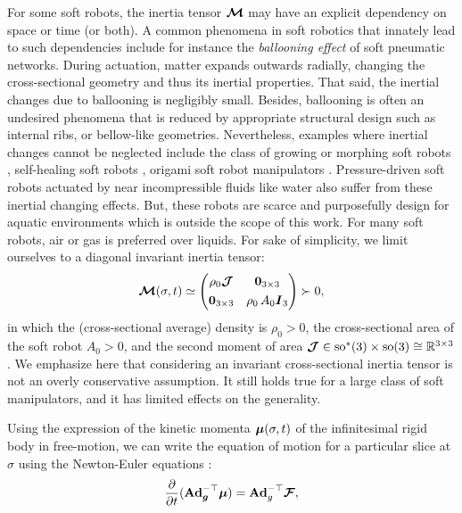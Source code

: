 \begin{rmk}
  For some soft robots, the inertia tensor ${\boldsymbol{\mathcal{M}}}$ may have an explicit dependency on space or time (or both). A common phenomena in soft robotics that innately lead to such dependencies include for instance the \textit{ballooning effect} of soft pneumatic networks. During actuation, matter expands outwards radially, changing the cross-sectional geometry and thus its inertial properties. That said, the inertial changes due to ballooning is negligibly small. Besides, ballooning is often an undesired phenomena that is reduced by appropriate structural design such as internal ribs, or bellow-like geometries. Nevertheless, examples where inertial changes cannot be neglected include the class of growing or morphing soft robots \cite{Hawkes2017,Joachimczak2014Jul,Joachimczak2015}, self-healing soft robots \cite{Terryn2021Jul,Roels2020Dec}, origami soft robot manipulators \cite{Li2022Nov,Jiang2016Dec,Wu2021Sep}. Pressure-driven soft robots actuated by near incompressible fluids like water also suffer from these inertial changing effects. But, these robots are scarce and purposefully design for aquatic environments which is outside the scope of this work. For many soft robots, air or gas is preferred over liquids. 
For sake of simplicity, we limit ourselves to a diagonal invariant inertia tensor: 
%
\begin{equation*}
{\boldsymbol{\mathcal{M}}}(\sigma,t) \simeq \begin{pmatrix} \rho_0 \boldsymbol{\mathcal{J}}  & \boldsymbol{0}_{3\times3}  \\[0.35em]
  \boldsymbol{0}_{3\times3} & \rho_0\, A_0\boldsymbol{I}_3 \end{pmatrix} \succ 0,
\end{equation*}
%
in which the (cross-sectional average) density is $\rho_0 > 0$, the cross-sectional area of the soft robot $A_0>0$, and the second moment of area $\boldsymbol{\mathcal{J}} \in \textup{\textrm{so}}^*(3) \times \textup{\textrm{so}}(3) \cong \mathbb{R}^{3\times 3}$.
We emphasize here that considering an invariant cross-sectional inertia tensor is not an overly conservative assumption. It still holds true for a large class of soft manipulators, and it has limited effects on the generality. \end{rmk}
%
\noindent Using the expression of the kinetic momenta $\boldsymbol{\mu}(\sigma,t)$ of the infinitesimal rigid body in free-motion, we can write the equation of motion for a particular slice at $\sigma$ using the Newton-Euler equations \cite{Garofalo2013}:
%
\begin{equation}
\frac{\partial }{\partial t} (\textbf{Ad}_{{\boldsymbol{g}}}^{-\top} \boldsymbol{\mu}) = \textbf{Ad}_{g}^{-\top}\boldsymbol{\mathcal{F}},\label{eq:C3:newton_euler}
\end{equation}
